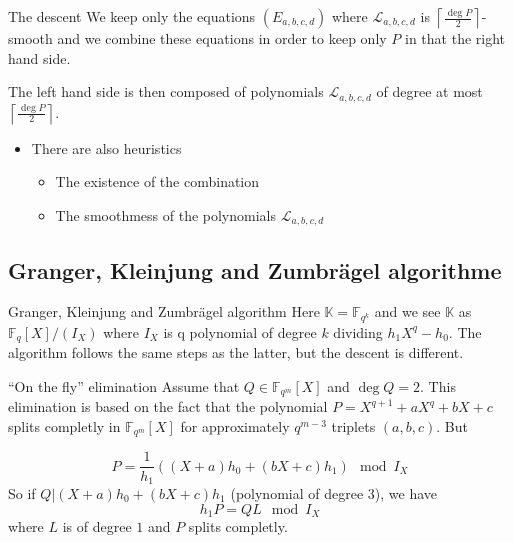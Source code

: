 \documentclass[xcolor=x11names,compress]{beamer}
\theoremstyle{break}
\theoremstyle{sc}
\theoremstyle{definition}
\theoremstyle{remark}
\begin{document}
\begin{frame}{The descent}
  We keep only the equations $(E_{a, b, c, d})$ where
  $\mathcal L_{a, b, c, d}$ is
  $\left\lceil \frac{\deg P}{2}\right\rceil$-smooth and we combine these equations
  in order to keep only $P$ in that the right hand side.

  The left hand side is then composed of polynomials $\mathcal L_{a, b, c, d}$
  of degree at most $\left\lceil \frac{\deg P}{2}\right\rceil$.

  \begin{itemize}
    \item There are also heuristics
      \begin{itemize}
        \item The existence of the combination
        \item The smoothmess of the polynomials $\mathcal L_{a, b, c, d}$
      \end{itemize}
  \end{itemize}
\end{frame}


\subsection{Granger, Kleinjung and Zumbrägel algorithme}

\begin{frame}{Granger, Kleinjung and Zumbrägel algorithm}
  Here $\mathbb{K}=\mathbb{F}_{q^k}$ and we see $\mathbb{K}$ as
  $\mathbb{F}_q[X]/(I_X)$ where $I_X$ is q polynomial of degree $k$ dividing
  $h_1X^q-h_0$. The algorithm follows the same steps as the latter, but the
  descent is different.
\end{frame}

\begin{frame}{``On the fly'' elimination}
  Assume that $Q\in \mathbb{F}_{q^m}[X]$ and $\deg Q = 2$. This elimination is
  based on the fact that the polynomial $P = X^{q+1}+aX^q+bX+c$ splits completly
  in $\mathbb{F}_{q^m}[X]$ for approximately $q^{m-3}$ triplets $(a, b, c)$. But
  
  \[
    P = \frac{1}{h_1}((X+a)h_0 + (bX+c)h_1)\mod I_X
  \]
  So if $Q| (X+a)h_0 + (bX+c)h_1$ (polynomial of degree $3$), we have 
  \[
    h_1P=QL \mod I_X
  \]
  where $L$ is of degree $1$ and $P$ splits completly.

\end{frame}
\end{document}

